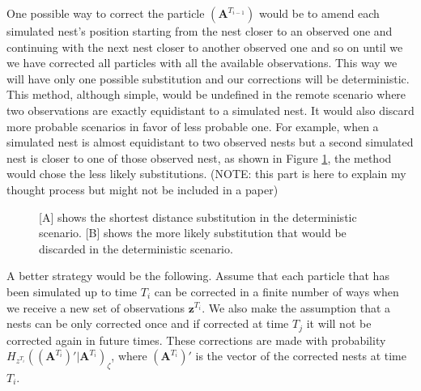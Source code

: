 \documentclass{article}
\renewcommand{\vec}[1]{\mathbf{#1}}
\begin{document}
One possible way to correct the particle $(\vec{A}^{T_{i-1}})$ would be to amend each simulated nest's position starting from the nest closer to an observed one and continuing with the next nest closer to another observed one and so on until we we have corrected all particles with all the available observations. This way we will have only one possible substitution and our corrections will be deterministic. This method, although simple, would be undefined in the remote scenario where two observations are exactly equidistant to a simulated nest. It would also discard more probable scenarios in favor of less probable one. For example, when a simulated nest is almost equidistant to two observed nests but a second simulated nest is closer to one of those observed nest, as shown in Figure \ref{fig:1}, the method would chose the less likely substitutions. (NOTE: this part is here to explain my thought process but might not be included in a paper)

\begin{figure}
\centering
\caption{[A] shows the shortest distance substitution in the deterministic scenario. [B] shows the more likely substitution that would be discarded in the deterministic scenario.}
\label{fig:1}
\end{figure}

A better strategy would be the following. Assume that each particle that has been simulated up to time $T_i$ can be corrected in a finite number of ways when we receive a new set of observations $\vec{z}^{T_i}$. We also make the assumption that a nests can be only corrected once and if corrected at time $T_j$ it will not be corrected again in future times. These corrections are made with probability $H_{z^{T_i}}((\vec{A}^{T_i})' | \vec{A}^{T_i})_{\zeta}$, where $(\vec{A}^{T_i})'$ is the vector of the corrected nests at time $T_i$.
\end{document}

